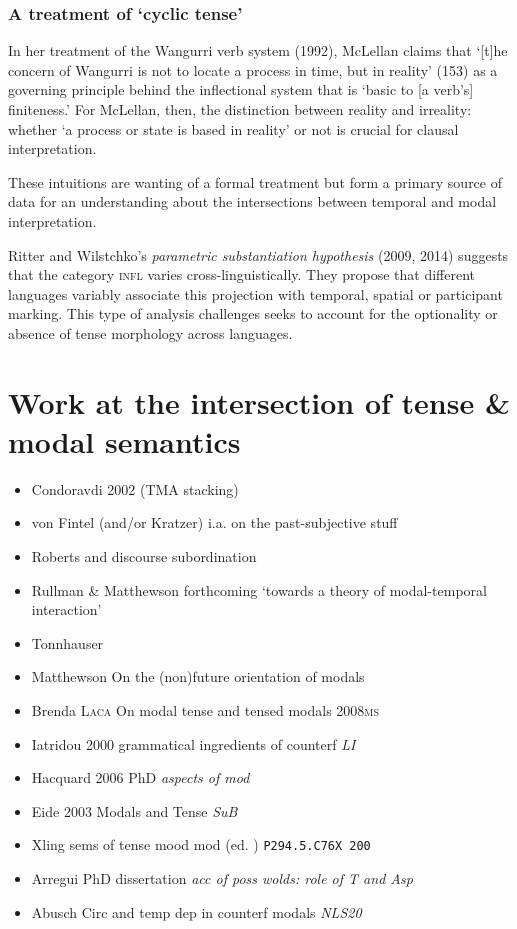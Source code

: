 \documentclass[12pt]{article}
\begin{document}
\subsubsection{A treatment of `cyclic tense'}

In her treatment of the Wangurri verb system (1992), McLellan claims that `[t]he concern of Wangurri is not to locate a process in time, but in reality' (153) as a governing principle behind the inflectional system that is `basic to [a verb's] finiteness.' For McLellan, then, the distinction between reality and irreality: whether `a process or state is based in reality' or not is crucial for clausal interpretation.

These intuitions are wanting of a formal treatment but form a primary source of data for an understanding about the intersections between temporal and modal interpretation.

Ritter and Wilstchko's \textit{parametric substantiation hypothesis} (2009, 2014) suggests that the category \textsc{infl} varies cross-linguistically. They propose that different languages variably associate this projection with temporal, spatial or participant marking. This type of analysis challenges seeks to account for the optionality or absence of tense morphology across languages.

\section{Work at the intersection of tense \& modal semantics}
\begin{itemize}
	\item Condoravdi 2002 (TMA stacking)
\item	von Fintel (and/or Kratzer) i.a. on the past-subjective stuff
\item Roberts and discourse subordination
\item Rullman \& Matthewson forthcoming `towards a theory of modal-temporal interaction'

\item Tonnhauser
\item Matthewson On the (non)future orientation of modals
\item Brenda \textsc{Laca} On modal tense and tensed modals  2008\textsc{ms}
\item Iatridou 2000 grammatical ingredients of counterf \textit{LI}
\item Hacquard 2006 PhD \textit{aspects of mod}
\item Eide 2003 Modals and Tense \textit{SuB}
\item Xling sems of tense mood mod (ed.	) \texttt{P294.5.C76X 200}
\item Arregui PhD dissertation \textit{acc of poss wolds: role of T and Asp}
\item Abusch Circ and temp dep in counterf modals \textit{NLS20}
\end{itemize}	
\end{document}
